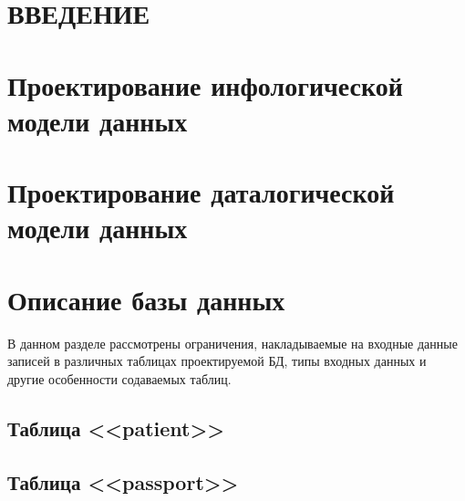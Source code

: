 






\newpage
{}
\tableofcontents

\newpage
{}


\titleformat{\section}{\centering\normalfont\normalsize}{\thesection}{1.0em}{}
\titleformat{\subsection}{\centering\normalfont\normalsize}{\thesubsection}{1.0em}{}

\newpage
{}
\setcounter{section}{0}
\section*{ВВЕДЕНИЕ}


\newpage
\section{Проектирование инфологической модели данных}
\setcounter{figure}{0}


\newpage
\section{Проектирование даталогической модели данных}
\setcounter{figure}{0}


\newpage
\section{Описание базы данных}
\setcounter{figure}{0}
В данном разделе рассмотрены ограничения, накладываемые на входные данные записей в различных таблицах проектируемой БД, типы входных данных и другие особенности содаваемых таблиц.

\subsection{Таблица <<patient>>}

\subsection{Таблица <<passport>>}

